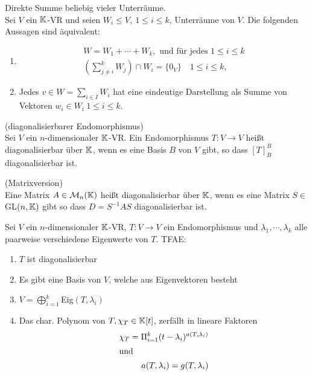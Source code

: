\begin{definition}
Direkte Summe beliebig vieler Unterräume.\\
Sei $V$ ein $\mathbb{K}$-VR und seien $W_i \leq V,\ 1\leq i\leq k$, Unterräume von $V$. Die folgenden Aussagen sind äquivalent:
\begin{enumerate}
    \item \begin{align*}
        W=W_1+\dotsb+W_k, \text{   und für jedes } 1\leq i \leq k\\
        \left(\sum_{j\neq i}^kW_j\right)\cap W_i =\{0_V\}\quad 1\leq i\leq k,
    \end{align*}
    \item Jedes $v\in W= \sum_{i\in I}W_i$ hat eine eindeutige Darstellung als Summe von Vektoren $w_i\in W_i \ 1\leq i\leq k.$
\end{enumerate}
\end{definition}

\begin{definition}
(diagonalisierbarer Endomorphismus)\\
Sei $V$ ein $n$-dimensionaler $\mathbb{K}$-VR. Ein Endomorphismus $T:V\to V$ heißt diagonalisierbar über $\mathbb{K}$, wenn es eine Basis $B$ von $V$ gibt, so dass $[T]_B^B$ diagonalisierbar ist.
\end{definition}

\begin{definition}
(Matrixversion)\\
Eine Matrix $A\in\mathcal{M}_n(\mathbb{K})$ heißt diagonalisierbar über $\mathbb{K}$, wenn es eine Matrix $S\in$ GL$(n,\mathbb{K})$ gibt so dass $D=S^{-1}AS$ diagonalisierbar ist.
\end{definition}

\begin{theorem}
Sei $V$ ein $n$-dimensionaler $\mathbb{K}$-VR, $T:V\to V$ ein Endomorphismus und $\lambda_1,\dotsb,\lambda_k$ alle paarweise verschiedene Eigenwerte von $T$. \quad TFAE:
\begin{enumerate}[1.]
    \item $T$ ist diagonalisierbar
    \item Es gibt eine Basis von $V$, welche aus Eigenvektoren besteht
    \item $V=\bigoplus_{i=1}^k$Eig$(T,\lambda_i)$
    \item Das char. Polynom von $T, \chi_T\in\mathbb{K}[t]$, zerfällt in lineare Faktoren
    \begin{align*}
        \chi_T=\Pi_{i=1}^k(t-\lambda_i)^{a(T,\lambda_i)}\\
        \intertext{und} a(T,\lambda_i)=g(T,\lambda_i)
    \end{align*}
\end{enumerate}
\end{theorem}

